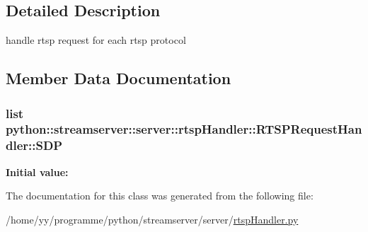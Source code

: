 \subsection{Detailed Description}
\begin{DoxyVerb}handle  rtsp request for each rtsp protocol\end{DoxyVerb}
 

\subsection{Member Data Documentation}
\hypertarget{classpython_1_1streamserver_1_1server_1_1rtspHandler_1_1RTSPRequestHandler_aa5ec1068368c201a4b13e20bb1dd50f2}{
\subsubsection[{SDP}]{\setlength{\rightskip}{0pt plus 5cm}list python::streamserver::server::rtspHandler::RTSPRequestHandler::SDP}}
\label{classpython_1_1streamserver_1_1server_1_1rtspHandler_1_1RTSPRequestHandler_aa5ec1068368c201a4b13e20bb1dd50f2}
{\bfseries Initial value:}
\begin{DoxyCode}
["v=0", "o=-1 1 IN IP4 127.0.0.1",
                "s=VStream Live", "t=0 0",
                "i=ICL Streaming Media",
                "c=IN IP4 0.0.0.0"]
\end{DoxyCode}


The documentation for this class was generated from the following file:\begin{DoxyCompactItemize}
\item 
/home/yy/programme/python/streamserver/server/\hyperlink{rtspHandler_8py}{rtspHandler.py}\end{DoxyCompactItemize}
